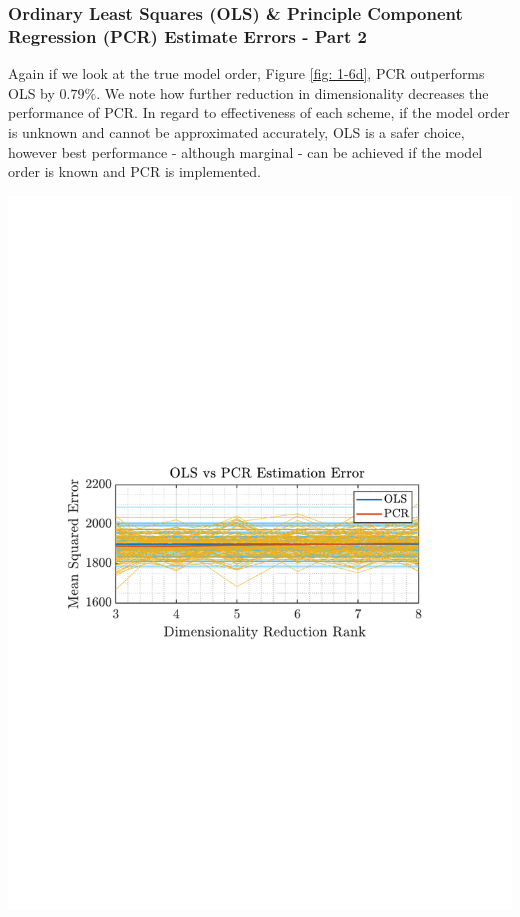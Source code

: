 \documentclass[12pt]{article}
\begin{document}
		
	 	\subsubsection{Ordinary Least Squares (OLS) \& Principle Component Regression (PCR)  Estimate Errors - Part 2}
	 	\begin{minipage}{0.49\textwidth}
	 		Again if we look at the true model order, Figure \ref{fig: 1-6d}, PCR outperforms OLS by $0.79\%$. We note how further reduction in dimensionality decreases the performance of PCR. In regard to effectiveness of each scheme, if the model order is unknown and cannot be approximated accurately, OLS is a safer choice, however best performance - although marginal - can be achieved if the model order is known and PCR is implemented.
	 	\end{minipage}%
		 \begin{minipage}{0.04\textwidth}
		 	  \hspace*{0.04\textwidth}
		 \end{minipage}%
	 	\begin{minipage}{0.49\textwidth}
			\centering
	 		\includegraphics[trim={2.2cm 11.2cm 3.15cm  11.2cm}, clip, width=\textwidth]{../MATLAB/figures/q1_6d_fig01.pdf} 
	 		\captionsetup{justification=centering}
	 		\label{fig: 1-6d}
	 	\end{minipage}%
 
\end{document}
